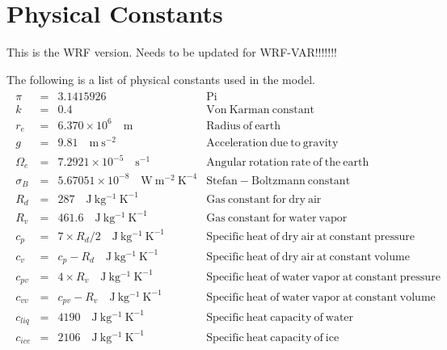 \chapter{Physical Constants}
\label{physical_constants}

This is the WRF version. Needs to be updated for WRF-VAR!!!!!!!

The following is a list of physical constants used in the model.
\\[3ex]

\begin{eqnarray*}
\begin{array}{lcll}
\pi & = & 3.1415926 & \mathrm{Pi} \\
k & = & 0.4  & \mathrm{Von \: Karman \: constant} \\
r_e & = & 6.370 \times 10^{6} \quad\mathrm{m} & \mathrm{ Radius \: of \: earth} \\
g & = & 9.81 \quad\mathrm{m \: s^{-2}} & \mathrm{ Acceleration \: due \: to \: gravity}\\
\Omega_{e} & = & 7.2921 \times 10^{-5} \quad\mathrm{s^{-1}} & \mathrm{ Angular \: rotation \: rate \: of \: the \: earth}\\
\sigma_{B} & = & 5.67051 \times 10^{-8} \quad\mathrm{W \: m^{-2} \: K^{-4}} & \mathrm{ Stefan-Boltzmann \: constant}\\
R_{d} & = & 287 \quad\mathrm{J \: kg^{-1} \: K^{-1}} & \mathrm{ Gas \: constant \: for \: dry \: air}\\
R_{v} & = & 461.6 \quad\mathrm{J \: kg^{-1} \: K^{-1}} & \mathrm{ Gas \: constant \: for \: water \: vapor}\\
c_{p} & = & 7 \times R_{d}/2 \quad\mathrm{J \: kg^{-1} \: K^{-1}} & \mathrm{ Specific \: heat \: of \: dry \: air \: at \: constant \: pressure}\\
c_{v} & = & c_{p}-R_{d} \quad\mathrm{J \: kg^{-1} \: K^{-1}} & \mathrm{ Specific \: heat \: of \: dry \: air \: at \: constant \: volume}\\
c_{pv} & = & 4 \times R_{v} \quad\mathrm{J \: kg^{-1} \: K^{-1}} & \mathrm{ Specific \: heat \: of \: water \: vapor \: at \: constant \: pressure}\\
c_{vv} & = & c_{pv}-R_{v} \quad\mathrm{J \: kg^{-1} \: K^{-1}} & \mathrm{ Specific \: heat \: of \: water \: vapor \: at \: constant \: volume}\\
c_{liq} & = & 4190 \quad\mathrm{J \: kg^{-1} \: K^{-1}} & \mathrm{ Specific \: heat \: capacity \: of \: water}\\
c_{ice} & = & 2106 \quad\mathrm{J \: kg^{-1} \: K^{-1}} & \mathrm{ Specific \: heat \: capacity \: of \: ice}\\

\end{array}
\end{eqnarray*}
